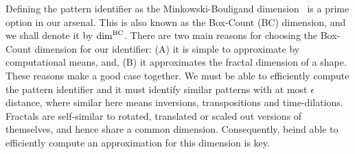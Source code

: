   Defining the pattern identifier as the Minkowski-Bouligand
dimension~\cite{bouligand1928ensembles} is a prime option in our
arsenal.  This is also known as the Box-Count (BC) dimension, and we
shall denote it by $\mathrm{dim}^{\mathrm{BC}}$. There are two main reasons for choosing
the Box-Count dimension for our identifier: (A) it is simple to
approximate by computational means, and, (B) it approximates the
fractal dimension of a shape.  These reasons make a good case
together. We must be able to efficiently compute the pattern
identifier and it must identify similar patterns with at most
$\epsilon$ distance, where similar here means inversions,
transpositions and time-dilations. Fractals are self-similar to
rotated, translated or scaled out versions of themselves, and hence
share a common dimension. Consequently, beind able to efficiently
compute an approximation for this dimension is key.  







